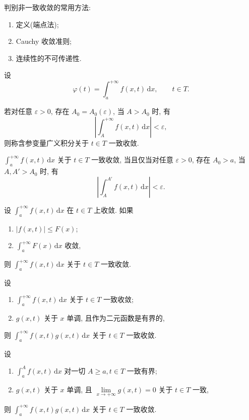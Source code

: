 \documentclass[../数学分析培优讲义.tex]{subfiles}
\begin{document}
判别非一致收敛的常用方法:
\begin{enumerate}[label=\textcircled{\arabic*},leftmargin=2.2em]
    \item 定义(端点法);
    \item Cauchy 收敛准则;
    \item 连续性的不可传递性.
\end{enumerate}

设
\[
    \varphi(t)=\int_a^{+\infty}f(x,t)\,\mathrm{d}x,\qquad t\in T.
\]

\begin{definition}
若对任意 $\varepsilon>0$, 存在 $A_0=A_0(\varepsilon)$, 当 $A>A_0$ 时, 有
\[
    \left|\int_A^{+\infty}f(x,t)\,\mathrm{d}x\right|<\varepsilon,
\]
则称含参变量广义积分关于 $t\in T$ 一致收敛.
\end{definition}

\begin{theorem}
$\displaystyle\int_a^{+\infty}f(x,t)\,\mathrm{d}x$ 关于 $t\in T$ 一致收敛, 当且仅当对任意 $\varepsilon>0$, 存在 $A_0>a$, 当 $A,A'>A_0$ 时, 有
\[
    \left|\int_A^{A'}f(x,t)\,\mathrm{d}x\right|<\varepsilon.
\]
\end{theorem}

\begin{theorem}
设 $\displaystyle\int_a^{+\infty}f(x,t)\,\mathrm{d}x$ 在 $t\in T$ 上收敛. 如果
\begin{enumerate}[label=(\arabic*)]
    \item $|f(x,t)|\leq F(x)$;
    \item $\displaystyle\int_a^{+\infty}F(x)\,\mathrm{d}x$ 收敛,
\end{enumerate}
则 $\displaystyle\int_a^{+\infty}f(x,t)\,\mathrm{d}x$ 关于 $t\in T$ 一致收敛.
\end{theorem}

\begin{theorem}
设
\begin{enumerate}[label=(\arabic*)]
    \item $\displaystyle\int_a^{+\infty}f(x,t)\,\mathrm{d}x$ 关于 $t\in T$ 一致收敛;
    \item $g(x,t)$ 关于 $x$ 单调, 且作为二元函数是有界的,
\end{enumerate}
则 $\displaystyle\int_a^{+\infty}f(x,t)g(x,t)\,\mathrm{d}x$ 关于 $t\in T$ 一致收敛.
\end{theorem}

\begin{theorem}
设
\begin{enumerate}[label=(\arabic*)]
    \item $\displaystyle\int_a^A f(x,t)\,\mathrm{d}x$ 对一切 $A\geq a,t\in T$ 一致有界;
    \item $g(x,t)$ 关于 $x$ 单调, 且 $\displaystyle\lim\limits_{x\to+\infty}g(x,t)=0$ 关于 $t\in T$ 一致,
\end{enumerate}
则 $\displaystyle\int_a^{+\infty}f(x,t)g(x,t)\,\mathrm{d}x$ 关于 $t\in T$ 一致收敛.
\end{theorem}
\end{document}
